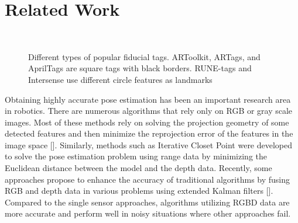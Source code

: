 \section{Related Work}
\label{sec:related}
\begin{figure}
\centering
{} \quad
{} \quad 
{} \\
 \quad
{}
\caption{Different types of popular fiducial tags. ARToolkit, ARTags, and AprilTags are square tags with black borders. RUNE-tags and Intersense use different circle features as landmarks}
\label{fig:exp_setup}
\end{figure}
	Obtaining highly accurate pose estimation has been an important research area in robotics. There are numerous algorithms that rely only on RGB or gray scale images. Most of these methods rely on solving the projection geometry of some detected features and then minimize the reprojection error of the features in the image space [].  Similarly, methods such as Iterative Closet Point were developed to solve the pose estimation problem using range data by minimizing the Euclidean distance between the model and the depth data. Recently, some approaches propose to enhance the accuracy of traditional algorithms by fusing RGB and depth data in various problems using extended Kalman filters []. Compared to the single sensor approaches, algorithms utilizing RGBD data are more accurate and perform well in noisy situations where other approaches fail. 
	

